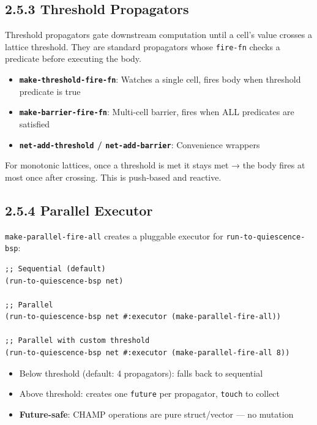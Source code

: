 \documentclass[11pt]{article}
\begin{document}
\subsection{2.5.3 Threshold Propagators}
\label{sec:org7a74020}

Threshold propagators gate downstream computation until a cell's value
crosses a lattice threshold. They are standard propagators whose \texttt{fire-fn}
checks a predicate before executing the body.

\begin{itemize}
\item \textbf{\texttt{make-threshold-fire-fn}}: Watches a single cell, fires body when
threshold predicate is true
\item \textbf{\texttt{make-barrier-fire-fn}}: Multi-cell barrier, fires when ALL predicates
are satisfied
\item \textbf{\texttt{net-add-threshold} / \texttt{net-add-barrier}}: Convenience wrappers
\end{itemize}

For monotonic lattices, once a threshold is met it stays met → the body
fires at most once after crossing. This is push-based and reactive.
\subsection{2.5.4 Parallel Executor}
\label{sec:org195e192}

\texttt{make-parallel-fire-all} creates a pluggable executor for
\texttt{run-to-quiescence-bsp}:

\begin{verbatim}
;; Sequential (default)
(run-to-quiescence-bsp net)

;; Parallel
(run-to-quiescence-bsp net #:executor (make-parallel-fire-all))

;; Parallel with custom threshold
(run-to-quiescence-bsp net #:executor (make-parallel-fire-all 8))
\end{verbatim}

\begin{itemize}
\item Below threshold (default: 4 propagators): falls back to sequential
\item Above threshold: creates one \texttt{future} per propagator, \texttt{touch} to collect
\item \textbf{Future-safe}: CHAMP operations are pure struct/vector — no mutation
\end{itemize}
\end{document}

